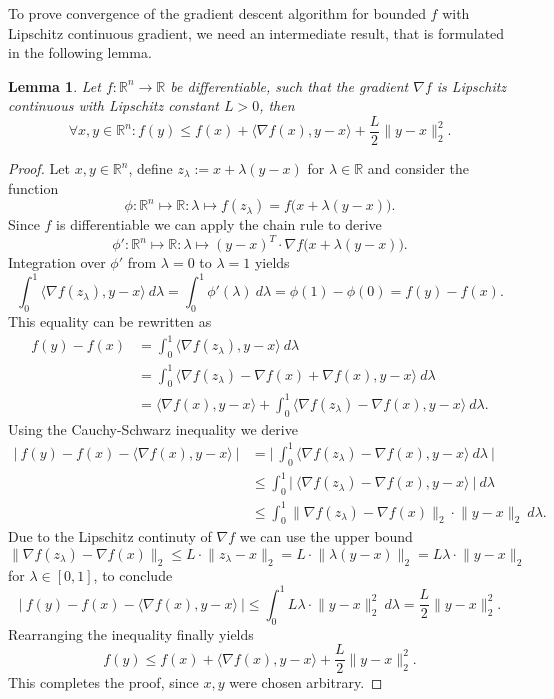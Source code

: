 \documentclass[11pt, a4paper]{article}
\newtheorem{lemma}[theorem]{Lemma}
\newcommand{\R}{\mathds{R}}
\begin{document}
To prove convergence of the gradient descent algorithm for bounded $f$ with Lipschitz continuous gradient, we need an intermediate result, that is formulated in the following lemma.

\begin{lemma} \label{lem:descent}
Let $f: \R^n \to \R$ be differentiable, such that the gradient $\nabla f$ is Lipschitz continuous with Lipschitz constant $L>0$, then
\[ \forall x,y \in \R^n : f(y) \leq f(x) + \big \langle \nabla f(x) , y -x \big \rangle + \frac{L}{2} \big \| y - x \big \|_2^2. \]
\end{lemma}

\begin{proof}
Let $x,y \in \R^n$, define $z_{\lambda} := x + \lambda (y - x)$ for $\lambda \in \R$ and consider the function
\[ \phi : \R^n \mapsto \R : \lambda \mapsto f(z_{\lambda}) = f \big (x + \lambda (y-x) \big ). \]
Since $f$ is differentiable we can apply the chain rule to derive
\[ \phi' : \R^n \mapsto \R : \lambda \mapsto (y-x)^T \cdot \nabla f \big ( x + \lambda (y-x) \big ). \]
Integration over $\phi'$ from $\lambda = 0$ to $\lambda = 1$ yields
\[ \int_{0}^{1} \big \langle \nabla f(z_{\lambda}), y-x \big \rangle \ d\lambda = \int_{0}^{1} \phi'(\lambda) \ d \lambda = \phi(1) - \phi(0) = f(y) - f(x). \]
This equality can be rewritten as
\[ \begin{split} 
f(y) - f(x) 
&= \int_{0}^{1}\big \langle \nabla f(z_{\lambda}), y-x \big \rangle \ d\lambda \\\
&= \int_{0}^{1} \big \langle \nabla f(z_{\lambda}) - \nabla f(x) + \nabla f(x) , y-x\big \rangle \ d\lambda \\\
&= \big \langle \nabla f(x), y-x \big \rangle + \int_{0}^{1} \big \langle \nabla f(z_{\lambda}) - \nabla f(x), y-x \big \rangle \ d\lambda.
\end{split} \]
Using the Cauchy-Schwarz inequality we derive
\[ \begin{split}
\Big | \ f(y) - f(x) - \big \langle \nabla f(x), y-x \big \rangle \ \Big | 
&= \Big | \ \int_{0}^{1} \big \langle \nabla f(z_{\lambda}) - \nabla f(x), y-x \big \rangle \ d\lambda \ \Big | \\\
&\leq \int_{0}^{1} \Big | \ \big \langle \nabla f(z_{\lambda}) - \nabla f(x), y-x \big \rangle \ \Big | \ d\lambda \\\
&\leq \int_{0}^{1} \big \| \nabla f( z_{\lambda}) - \nabla f(x) \big \|_2 \cdot \big \| y-x \big \|_2 \ d\lambda.
\end{split} \]
Due to the Lipschitz continuty of $\nabla f$ we can use the upper bound 
\[ \big \| \nabla f( z_{\lambda}) - \nabla f(x) \big \|_2 \leq L \cdot \big \| z_{\lambda} - x \big \|_2 = L \cdot \big \| \lambda(y-x) \big \|_2 = L\lambda \cdot \big \| y-x \big \|_2 \]
for $\lambda \in [0,1]$, to conclude
\[ \Big | \ f(y) - f(x) - \big \langle \nabla f(x), y-x \big \rangle \ \Big | \leq \int_{0}^{1} L\lambda \cdot \big \| y-x \big \|_2^2 \ d\lambda = \frac{L}{2} \big \| y-x \big \|_2^2. \]
Rearranging the inequality finally yields
\[ f(y) \leq f(x) + \big \langle \nabla f(x) , y -x \big \rangle + \frac{L}{2} \big \| y - x \big \|_2^2. \]
This completes the proof, since $x,y$ were chosen arbitrary.
\end{proof}
\end{document}
